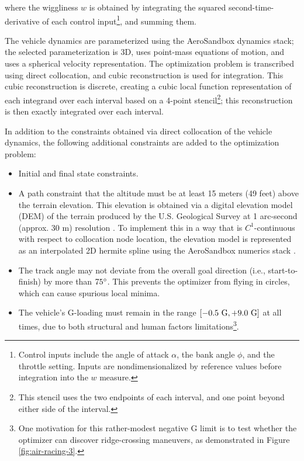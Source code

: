 \noindent where the wiggliness $w$ is obtained by integrating the squared second-time-derivative of each control input\footnote{Control inputs include the angle of attack $\alpha$, the bank angle $\phi$, and the throttle setting. Inputs are nondimensionalized by reference values before integration into the $w$ measure.}, and summing them.

The vehicle dynamics are parameterized using the AeroSandbox dynamics stack; the selected parameterization is 3D, uses point-mass equations of motion, and uses a spherical velocity representation. The optimization problem is transcribed using direct collocation, and cubic reconstruction is used for integration. This cubic reconstruction is discrete, creating a cubic local function representation of each integrand over each interval based on a 4-point stencil\footnote{This stencil uses the two endpoints of each interval, and one point beyond either side of the interval.}; this reconstruction is then exactly integrated over each interval.

In addition to the constraints obtained via direct collocation of the vehicle dynamics, the following additional constraints are added to the optimization problem:
\begin{itemize}
    \item Initial and final state constraints.
    \item A path constraint that the altitude must be at least 15 meters (49 feet) above the terrain elevation. This elevation is obtained via a digital elevation model (DEM) of the terrain produced by the U.S. Geological Survey at 1 arc-second (approx. 30 m) resolution \cite{usgs_2022_dem}. To implement this in a way that is $C^1$-continuous with respect to collocation node location, the elevation model is represented as an interpolated 2D hermite spline using the AeroSandbox numerics stack \cite{sharpe_core_2022}.
    \item The track angle may not deviate from the overall goal direction (i.e., start-to-finish) by more than $75\degree$. This prevents the optimizer from flying in circles, which can cause spurious local minima.
    \item The vehicle's G-loading must remain in the range $[{-0.5\ \rm G}, {+9.0\ \rm G}]$ at all times, due to both structural and human factors limitations\footnote{One motivation for this rather-modest negative G limit is to test whether the optimizer can discover ridge-crossing maneuvers, as demonstrated in Figure \ref{fig:air-racing-3}.}.
\end{itemize}

